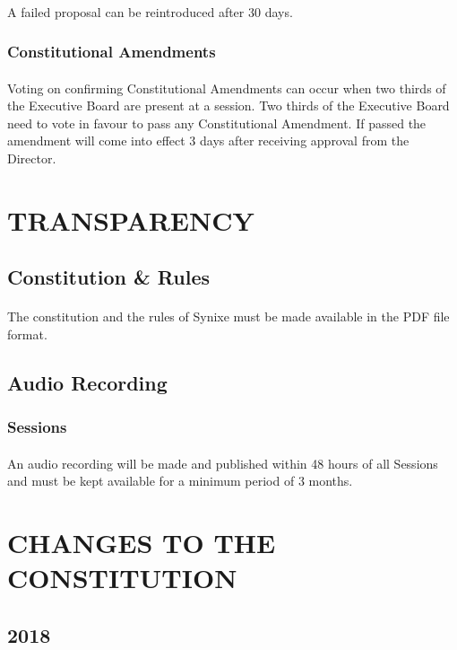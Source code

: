 \documentclass[10pt,a4paper]{article}
\begin{document}
\paragraph{}
A failed proposal can be reintroduced after 30 days.
\subsubsection{Constitutional Amendments}
\paragraph{}
Voting on confirming Constitutional Amendments can occur when two thirds of the Executive Board are present at a session. Two thirds of the Executive Board need to vote in favour to pass any Constitutional Amendment. If passed the amendment will come into effect 3 days after receiving approval from the Director.
\section{TRANSPARENCY}
\subsection{Constitution \& Rules}
\paragraph{}
The constitution and the rules of Synixe must be made available in the PDF file format.
\subsection{Audio Recording}
\subsubsection{Sessions}
\paragraph{}
An audio recording will be made and published within 48 hours of all Sessions and must be kept available for a minimum period of 3 months.
\section{CHANGES TO THE CONSTITUTION}
\subsection{2018}
\end{document}
